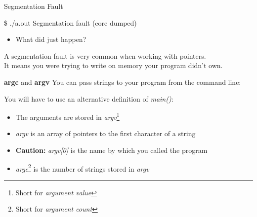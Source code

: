 \documentclass[10pt,graphics,aspectratio=169,table]{beamer}
\begin{document}
\begin{frame}[fragile]{Segmentation Fault}
    \begin{codeblock}[numbers=none]
\$ ./a.out 
Segmentation fault (core dumped)
    \end{codeblock}
    \begin{itemize}
        \item What did just happen?
    \end{itemize}
    

    A segmentation fault is very common when working with pointers.\\
    It means you were trying to write on memory your program didn't own. \\
 
\end{frame}
%
\begin{frame}[fragile]{\textbf{argc} and \textbf{argv}}
    You can pass strings to your program from the command line:
    \bigskip
    You will have to use an alternative definition of \textit{main()}:
\begin{codeblock}
int main(int argc, char *argv[]) {
\end{codeblock}
    \begin{itemize}
        \item The arguments are stored in \textit{argv}\footnote{Short for \textit{argument value}}
        \item \textit{argv} is an array of pointers to the first character of a string
        \item \textbf{Caution:} \textit{argv[0]} is the name by which you called the program
        \item \textit{argc}\footnote{Short for \textit{argument count}} is the number of strings stored in \textit{argv}
    \end{itemize}
\end{frame}
\end{document}
